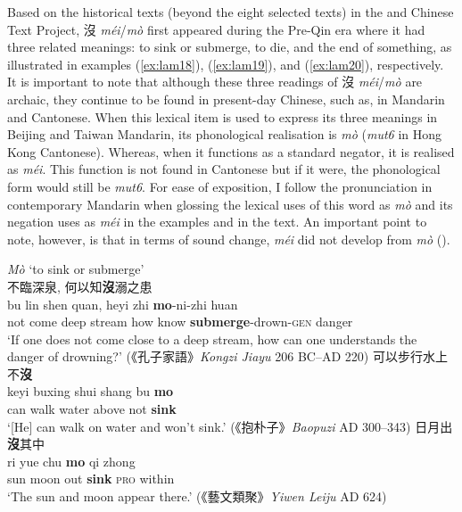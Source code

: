 \documentclass[output=paper]{langscibook}
\begin{document}
Based on the historical texts (beyond the eight selected texts) in the \cite{chant} and Chinese Text Project, 沒 \textit{méi}/\textit{mò} first appeared during the Pre-Qin era where it had three related meanings: to sink or submerge, to die, and the end of something, as illustrated in examples (\ref{ex:lam18}), (\ref{ex:lam19}), and (\ref{ex:lam20}), respectively. It is important to note that although these three readings of 沒 \textit{méi}/\textit{mò}  are archaic, they continue to be found in present-day Chinese, such as, in Mandarin and Cantonese. When this lexical item is used to express its three meanings in Beijing and Taiwan Mandarin, its phonological realisation is \textit{mò} (\textit{mut6} in Hong Kong Cantonese). Whereas, when it functions as a standard negator, it is realised as \textit{méi}. This function is not found in Cantonese but if it were, the phonological form would still be \textit{mut6}. For ease of exposition, I follow the pronunciation in contemporary Mandarin when glossing the lexical uses of this word as \textit{mò} and its negation uses as \textit{méi} in the examples and in the text. An important point to note, however, is that in terms of sound change, \textit{méi} did not develop from \textit{mò} (\citealt[390]{Schuessler2007}).

\ea \textit{Mò} `to sink or submerge'  \label{ex:lam18}\\
  \ea 不臨深泉, 何以知\textbf{沒}溺之患 \label{ex:lam18a}\\
  	\gll bu lin shen quan, heyi zhi \textbf{mo}-ni-zhi huan\\
  	not come	 deep stream how know \textbf{submerge}-drown-\textsc{gen} danger\\ 
  	\glt `If one does not come close to a deep stream, how can one understands the danger of drowning?' (《孔子家語》\emph{Kongzi Jiayu} 206 BC–AD 220)  
  \ex 可以步行水上不\textbf{沒} \label{ex:lam18b}\\
  	\gll keyi buxing shui shang bu \textbf{mo}\\ 
  	can walk water above not \textbf{sink}\\
  	\glt `[He] can walk on water and won't sink.' (《抱朴子》\emph{Baopuzi} AD 300–343)  
  \ex 日月出\textbf{沒}其中 \label{ex:lam18c}\\
	\gll ri yue chu \textbf{mo} qi zhong\\ 
	sun	moon	 out \textbf{sink} \textsc{pro} within\\ 
	\glt `The sun and moon appear there.' (《藝文類聚》\emph{Yiwen Leiju} AD 624)
\z \z 
\end{document}
